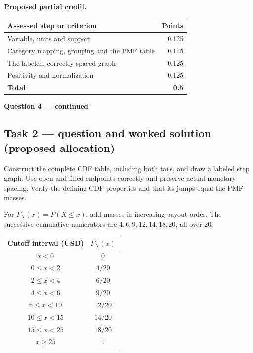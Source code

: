 \par\smallskip
\noindent\begin{minipage}{\linewidth}
\textbf{Proposed partial credit.}\par\smallskip
\begin{tabularx}{\linewidth}{@{}>{\raggedright\arraybackslash}X r@{}}\toprule
\textbf{Assessed step or criterion} & \textbf{Points}\\\midrule
Variable, units and support & 0.125\\
Category mapping, grouping and the PMF table & 0.125\\
The labeled, correctly spaced graph & 0.125\\
Positivity and normalization & 0.125\\
\midrule
\textbf{Total} & \textbf{0.5}\\
\bottomrule\end{tabularx}
\end{minipage}\par\smallskip

\par\vspace{3mm}\secInicio[][sec:q4]

\clearpage
\textbf{Question 4 --- continued}

\subsection*{Task 2 --- question and worked solution (proposed allocation) }
\label{sol:q4t2}

Construct the complete CDF table, including both tails, and draw a labeled step graph. Use open and filled endpoints correctly and preserve actual monetary spacing. Verify the defining CDF properties and that its jumps equal the PMF masses.

For $F_X(x)=P(X\leq x)$, add masses in increasing payout order. The successive cumulative numerators are $4,6,9,12,14,18,20$, all over $20$.

\begin{center}
\begin{tabular}{cc}\toprule
Cutoff interval (USD) & $F_X(x)$\\\midrule
$x<0$ & $0$\\
$0\leq x<2$ & $4/20$\\
$2\leq x<4$ & $6/20$\\
$4\leq x<6$ & $9/20$\\
$6\leq x<10$ & $12/20$\\
$10\leq x<15$ & $14/20$\\
$15\leq x<25$ & $18/20$\\
$x\geq 25$ & $1$\\
\bottomrule\end{tabular}
\end{center}

